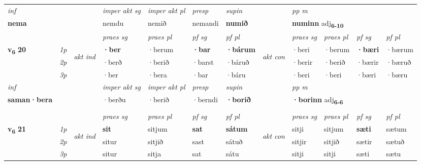 \begin{longtable}[l]{X>{\footnotesize\itshape}llXXXXlXXXX}
   {\textit{inf}} & &  & \textit{imper akt sg} & \textit{imper akt pl}   & \textit{presp} & \textit{supin}  && \textit{pp m} \\*
  {\textbf{nema}} & && nemdu  & nemið   & nemandi &  \textbf{numið}  && \multicolumn{2}{l}{\textbf{numinn} adj\textbf{\textsubscript{6-10}}} \\*

\midrule

 & &   & \textit{praes sg}  & \textit{praes pl}    & \textit{ pf sg} & \textit{pf pl} & & \textit{praes sg}  & \textit{praes pl}    & \textit{pf sg} & \textit{pf pl }  \\ \cmidrule{4-7} \cmidrule{9-12}
 \multirow{2}{*}{{{\textbf{v{\textsubscript{6}}} \Large{\textbf{20}}}}}  & 1p & \multirow{3}{*}{\begin{turn}{90}\textit{akt ind}\end{turn}} & \textbf{·ber} & ·berum & \textbf{·bar} & \textbf{·bárum} & \multirow{3}{*}{\begin{turn}{90}\textit{akt con}\end{turn}} &·beri & ·berum & \textbf{·bæri} & ·bærum\\*
 & 2p &  &  ·berð  & ·berið & ·barst & ·báruð & & ·berir & ·berið & ·bærir & ·bæruð \\*
 & 3p &  & ·ber & ·bera & ·bar & ·báru & & ·beri & ·beri& ·bæri & ·bæru \\*
\cmidrule{4-7} \cmidrule{9-12}

   {\textit{inf}} & &  & \textit{imper akt sg} & \textit{imper akt pl}   & \textit{presp} & \textit{supin}  && \textit{pp m} \\*
  {\textbf{saman\allowbreak ·bera}} & && ·berðu  & ·berið   & ·berndi &  \textbf{·borið}  && \multicolumn{2}{l}{\textbf{·borinn} adj\textbf{\textsubscript{6-6}}} \\*

\midrule
  & \\
   \midrule
 & &   & \textit{praes sg}  & \textit{praes pl}    & \textit{ pf sg} & \textit{pf pl} & & \textit{praes sg}  & \textit{praes pl}    & \textit{pf sg} & \textit{pf pl }  \\ \cmidrule{4-7} \cmidrule{9-12}
 \multirow{2}{*}{{{\textbf{v{\textsubscript{6}}} \Large{\textbf{21}}}}}  & 1p & \multirow{3}{*}{\begin{turn}{90}\textit{akt ind}\end{turn}} & \textbf{sit} & sitjum & \textbf{sat} & \textbf{sátum} & \multirow{3}{*}{\begin{turn}{90}\textit{akt con}\end{turn}} &sitji & sitjum & \textbf{sæti} & sætum\\*
 & 2p &  &  situr  & sitjið & sast & sátuð & & sitjir & sitjið & sætir & sætuð \\*
 & 3p &  & situr & sitja & sat & sátu & & sitji & sitji& sæti & sætu \\*
\cmidrule{4-7} \cmidrule{9-12}


\end{longtable}
